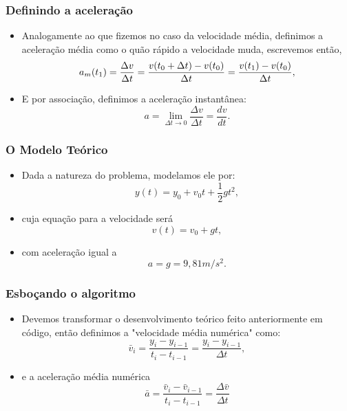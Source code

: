 \documentclass[notes=show]{beamer}
\begin{document}
\begin{frame}%

\frametitle{Definindo a acelera\c{c}\~{a}o}

\begin{itemize}
\item Analogamente ao que fizemos no caso da velocidade m\'{e}dia, definimos
a acelera\c{c}\~{a}o m\'{e}dia como o qu\~{a}o r\'{a}pido a velocidade muda,
escrevemos ent\~{a}o,%
\[
a_{m}(t_{1})=\frac{\Delta v}{\Delta t}=\frac{v(t_{0}+\Delta t)-v(t_{0})}{%
\Delta t}=\frac{v(t_{1})-v(t_{0})}{\Delta t},
\]

\item E por associação, definimos a acelera\c{c}\~{a}o instant\^{a}nea:%
\[
a=\lim_{\Delta t\rightarrow 0}\frac{\Delta v}{\Delta t}=\frac{dv}{dt}.
\]
\end{itemize}

\end{frame}%
\begin{frame}
\frametitle{O Modelo Teórico}
\begin{itemize}
	\item Dada a natureza do problema, modelamos ele por:%
	\[
	y\left( t\right) =y_{0}+v_{0}t+\frac{1}{2}gt^{2},
	\]
	
	\item cuja equa\c{c}\~{a}o para a velocidade ser\'{a}%
	\[
	v\left( t\right) =v_{0}+gt,
	\]
	
	\item com acelera\c{c}\~{a}o igual a%
	\[
	a=g=9,81m/s^{2}\text{.}
	\]
\end{itemize}
\end{frame}
\begin{frame}%

\frametitle{Esbo\c{c}ando o algoritmo}

\begin{itemize}
\item Devemos transformar o desenvolvimento te\'{o}rico feito anteriormente
em c\'{o}digo, ent\~{a}o definimos a "velocidade m\'{e}dia num\'{e}rica" como:%
\[
\bar{v}_{i}=\frac{y_{i}-y_{i-1}}{t_{i}-t_{i-1}}=\frac{y_{i}-y_{i-1}}{\Delta t%
},
\]

\item e a acelera\c{c}\~{a}o m\'{e}dia num\'{e}rica%
\[
\bar{a}=\frac{\bar{v}_{i}-\bar{v}_{i-1}}{t_{i}-t_{i-1}}=\frac{\Delta \bar{v}%
}{\Delta t}
\]
\end{itemize}

\end{frame}%
\end{document}
